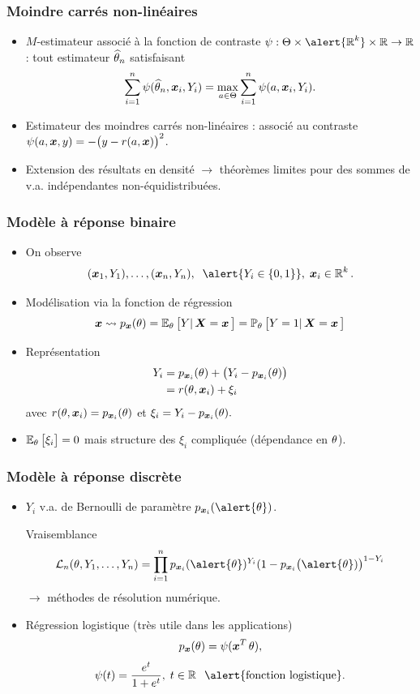 \begin{frame}
\frametitle{Moindre carrés non-linéaires}
\begin{df}
\begin{itemize}
\item $M$-estimateur associé à la \alert{fonction de contraste} $\psi:\Theta \times \alert{\R^k}\times \R\rightarrow \R$ : tout estimateur $\operatorname{\widehat \theta_{\mathnormal{n}}}$ satisfaisant
$$\sum_{i = 1}^n \psi(\operatorname{\widehat \theta_{\mathnormal{n}}}, \operatorname{\boldsymbol{x}}_i, Y_i) = \max_{a \in \Theta} \sum_{i = 1}^n \psi(a,\operatorname{\boldsymbol{x}}_i,Y_i).$$
\item Estimateur des \alert{moindres carrés non-linéaires} : associé au contraste $\psi(a,\operatorname{\boldsymbol{x}},y) = -\big(y-r(a,\operatorname{\boldsymbol{x}})\big)^2$.
\end{itemize}
\end{df}
\begin{itemize}
\item \alert{Extension} des résultats en densité
$\rightarrow$ théorèmes limites pour des sommes de v.a.
indépendantes \alert{ non-équidistribuées}.
\end{itemize}
\end{frame}

\begin{frame}
\frametitle{Modèle à réponse binaire}
\begin{itemize}
\item On observe
$$(\bx_1,Y_1),\ldots, (\bx_n,Y_n),\;\;\alert{Y_i \in \{0,1\}},\;\bx_i \in \R^k.$$
\item Modélisation \alert{via la fonction de régression}
$$\operatorname{\boldsymbol{x}} \leadsto p_{\operatorname{\boldsymbol{x}}}(\theta) = \operatorname{{\mathbb E}}_\theta\big[Y|\operatorname{\boldsymbol{X}} = \operatorname{\boldsymbol{x}}\big] = \operatorname{{\mathbb P}}_\theta\big[Y = 1|\operatorname{\boldsymbol{X}}=\operatorname{\boldsymbol{x}}\big]$$
\item \alert{Représentation}
\begin{align*}
Y_i & =  p_{\operatorname{\boldsymbol{x}}_i}(\theta)+\big(Y_i-p_{\operatorname{\boldsymbol{x}}_i}(\theta)\big) \\
& = r(\theta,\operatorname{\boldsymbol{x}}_i)+\xi_i
\end{align*}
avec
$r(\theta, \operatorname{\boldsymbol{x}}_i) = p_{\operatorname{\boldsymbol{x}}_i}(\theta)$ et $\xi_i = Y_i-p_{\operatorname{\boldsymbol{x}}_i}(\theta).$
\item $\operatorname{{\mathbb E}}_\theta\big[\xi_i\big]=0$ mais structure des $\xi_i$ \alert{compliquée} (dépendance en $\theta$).
\end{itemize}
\end{frame}

\begin{frame}
\frametitle{Modèle à réponse discrète}
\begin{itemize}
\item $Y_i $ v.a. de Bernoulli de paramètre $p_{\bx_i}(\alert{\truetheta})$.

\alert{ Vraisemblance}
$${\mathcal L}_n(\truetheta,Y_1,\ldots, Y_n) = \prod_{i = 1}^n p_{\bx_i}(\alert{\truetheta})^{Y_i}(1-p_{\bx_i}\big(\alert{\truetheta})\big)^{1-Y_i}$$
$\rightarrow$ méthodes de résolution numérique.
\item \alert{ Régression logistique} (très utile dans les applications)
$$p_{\operatorname{\boldsymbol{x}}}(\theta) = \psi(\operatorname{\boldsymbol{x}}^T\theta),$$
$$\psi(t)=\frac{e^t}{1+e^t},\;t \in \R\;\;\alert{{\text{fonction logistique}}}.$$
\end{itemize}
\end{frame}

